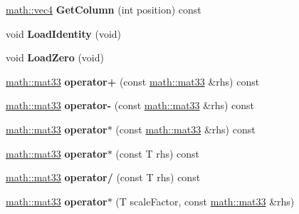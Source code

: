 \begin{DoxyCompactItemize}
\item 
\hypertarget{classmath_1_1mat33_aa2431b06b4a92a848788196320fc1170}{
\hyperlink{classmath_1_1vec4}{math::vec4} {\bfseries GetColumn} (int position) const }
\label{classmath_1_1mat33_aa2431b06b4a92a848788196320fc1170}

\item 
\hypertarget{classmath_1_1mat33_a660442aa3d0f1758ebdbbcb86e5566ef}{
void {\bfseries LoadIdentity} (void)}
\label{classmath_1_1mat33_a660442aa3d0f1758ebdbbcb86e5566ef}

\item 
\hypertarget{classmath_1_1mat33_a1c1e7268261a38f819464ccd6cedb80b}{
void {\bfseries LoadZero} (void)}
\label{classmath_1_1mat33_a1c1e7268261a38f819464ccd6cedb80b}

\item 
\hypertarget{classmath_1_1mat33_a9de3b92c041bcb43f6fba0c122cfe62e}{
\hyperlink{classmath_1_1mat33}{math::mat33} {\bfseries operator+} (const \hyperlink{classmath_1_1mat33}{math::mat33} \&rhs) const }
\label{classmath_1_1mat33_a9de3b92c041bcb43f6fba0c122cfe62e}

\item 
\hypertarget{classmath_1_1mat33_a20d0b77386c4bfa1d55d4c5bf4fd1cfb}{
\hyperlink{classmath_1_1mat33}{math::mat33} {\bfseries operator-\/} (const \hyperlink{classmath_1_1mat33}{math::mat33} \&rhs) const }
\label{classmath_1_1mat33_a20d0b77386c4bfa1d55d4c5bf4fd1cfb}

\item 
\hypertarget{classmath_1_1mat33_a0ed187770f2bdb867e466ad6c7aed258}{
\hyperlink{classmath_1_1mat33}{math::mat33} {\bfseries operator$\ast$} (const \hyperlink{classmath_1_1mat33}{math::mat33} \&rhs) const }
\label{classmath_1_1mat33_a0ed187770f2bdb867e466ad6c7aed258}

\item 
\hypertarget{classmath_1_1mat33_ac5dc23803bb63cbd1867a83b66c5c9b3}{
\hyperlink{classmath_1_1mat33}{math::mat33} {\bfseries operator$\ast$} (const T rhs) const }
\label{classmath_1_1mat33_ac5dc23803bb63cbd1867a83b66c5c9b3}

\item 
\hypertarget{classmath_1_1mat33_a44d0f147c5d3e7fcff6bcb751581e488}{
\hyperlink{classmath_1_1mat33}{math::mat33} {\bfseries operator/} (const T rhs) const }
\label{classmath_1_1mat33_a44d0f147c5d3e7fcff6bcb751581e488}

\item 
\hypertarget{classmath_1_1mat33_ab4b0b3852474d826fb681b529e2c94a0}{
\hyperlink{classmath_1_1mat33}{math::mat33} {\bfseries operator$\ast$} (T scaleFactor, const \hyperlink{classmath_1_1mat33}{math::mat33} \&rhs)}
\label{classmath_1_1mat33_ab4b0b3852474d826fb681b529e2c94a0}


\end{DoxyCompactItemize}
